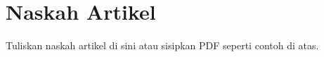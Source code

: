 \documentclass[proposal-publikasi]{unnes-ta_plus}
\begin{document}
\maketitleunnes
\unnesPersetujuanPembimbing

\tableofcontents
\unnesMainMatter

% 

\chapter{Naskah Artikel}
Tuliskan naskah artikel di sini atau sisipkan PDF seperti contoh di atas.
\end{document}
